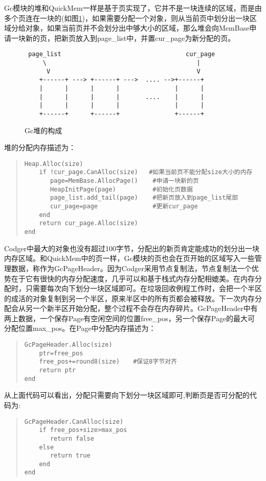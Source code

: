 Gc模块的堆和QuickMem一样是基于页实现了，它并不是一块连续的区域，而是由多个页连在一块的(如图\ref{fig:gc_heap})，如果需要分配一个对象，则从当前页中划分出一块区域分给对象，如果当前页并不会划分出中够大小的区域，那么堆会向MemBase申请一块新的页，把新页放入到page\_list中，并置cur\_page为新分配的页。
\begin{figure}
\begin{verbatim}
 page_list                                  cur_page
     \                                         |
      V                                        V
    +------+ ---> +------+ --->  .... -->+------+      
    |      |      |      |               |      |
    |      |      |      |       ....    |      |
    |      |      |      |               |      |
    +------+      +------+               +------+
\end{verbatim}
\caption{Gc堆的构成}
\label{fig:gc_heap}
\end{figure}
堆的分配内存描述为：
\begin{quote}
\begin{verbatim}
Heap.Alloc(size)
    if !cur_page.CanAlloc(size)   #如果当前页不能分配size大小的内存
       page=MemBase.AllocPage()    #申请一块新的页
       HeapInitPage(page)          #初始化页数据
       page_list.add_tail(page)    #把新页放入到page_list尾部
       cur_page=page               #更新cur_page
    end
    return cur_page.Alloc(size)
end
\end{verbatim}
\end{quote}
Codger中最大的对象也没有超过100字节，分配出的新页肯定能成功的划分出一块内存区域。和QuickMem中的页一样，Gc模块的页也会在页开始的区域写入一些管理数据，称作为GcPageHeader。因为Codger采用节点复制法，节点复制法一个优势在于它有很快的内存分配速度，几乎可以和基于栈式内存分配相媲美。在内存分配时，只需要每次向下划分一块区域即可。在垃圾回收例程工作时，会把一个半区的成活的对象复制到另一个半区，原来半区中的所有页都会被释放。下一次内存分配会从另一个新半区开始分配，整个过程不会存在内存碎片。GcPageHeader中有两上数据，一个保存Page有空闲空间的位置free\_pos，另一个保存Page的最大可分配位置max\_pos。在Page中分配内存描述为：
\begin{quote}
\begin{verbatim}
GcPageHeader.Alloc(size)
    ptr=free_pos
    free_pos+=round8(size)　  #保证8字节对齐
    return ptr
end 
\end{verbatim}
\end{quote}
从上面代码可以看出，分配只需要向下划分一块区域即可,判断页是否可分配的代码为:
\begin{quote}
\begin{verbatim}
GcPageHeader.CanAlloc(size)
    if free_pos+size>max_pos
       return false
    else 
       return true
    end
end 
\end{verbatim}
\end{quote}

